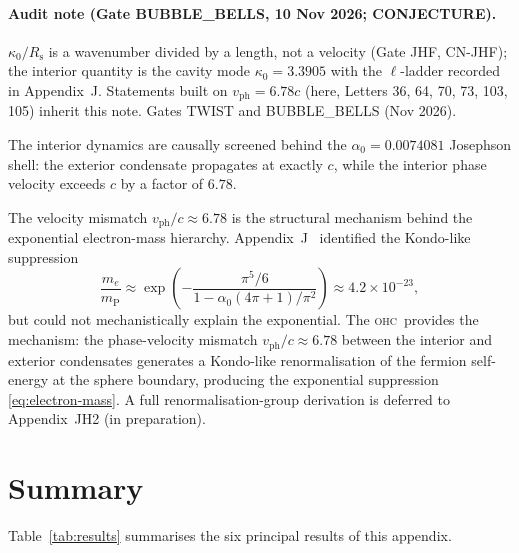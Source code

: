 \documentclass[aps,prl,preprint,superscriptaddress,floatfix]{revtex4-2}
\newcommand{\az}{\alpha_0}
\newcommand{\mP}{m_{\mathrm{P}}}
\newcommand{\OHC}{\textsc{ohc}}
\newcommand{\Rsph}{R_{\mathrm{s}}}
\newcommand{\kz}{\kappa_0}
\newcommand{\vph}{v_{\mathrm{ph}}}
\begin{document}
\paragraph*{Audit note (Gate BUBBLE\_BELLS, 10 Nov 2026; CONJECTURE).} $\kz/\Rsph$ is a wavenumber divided by a length, not a velocity (Gate JHF, CN-JHF); the interior quantity is the cavity mode $\kappa_0=3.3905$ with the $\ell$-ladder recorded in Appendix~J. Statements built on $\vph=6.78c$ (here, Letters 36, 64, 70, 73, 103, 105) inherit this note. Gates TWIST and BUBBLE\_BELLS (Nov 2026).

The interior dynamics are causally screened behind the
$\az = 0.0074081$ Josephson shell: the exterior condensate propagates at
exactly $c$, while the interior phase velocity exceeds $c$ by a factor
of $6.78$.

The velocity mismatch $\vph/c\approx 6.78$ is the structural mechanism
behind the exponential electron-mass hierarchy.
Appendix~J~\cite{AppJ} identified the Kondo-like suppression
\begin{equation}
  \frac{m_e}{\mP}
  \approx \exp\!\left(-\frac{\pi^5/6}{1-\az(4\pi+1)/\pi^2}\right)
  \approx 4.2\times 10^{-23},
  \label{eq:electron-mass}
\end{equation}
but could not mechanistically explain the exponential.
The \OHC\ provides the mechanism: the phase-velocity mismatch
$\vph/c\approx 6.78$ between the interior and exterior condensates
generates a Kondo-like renormalisation of the fermion self-energy at
the sphere boundary, producing the exponential suppression \eqref{eq:electron-mass}.
A full renormalisation-group derivation is deferred to
Appendix~JH2 (in preparation).

\section{Summary}
\label{sec:summary}

Table~\ref{tab:results} summarises the six principal results of this appendix.
\end{document}
